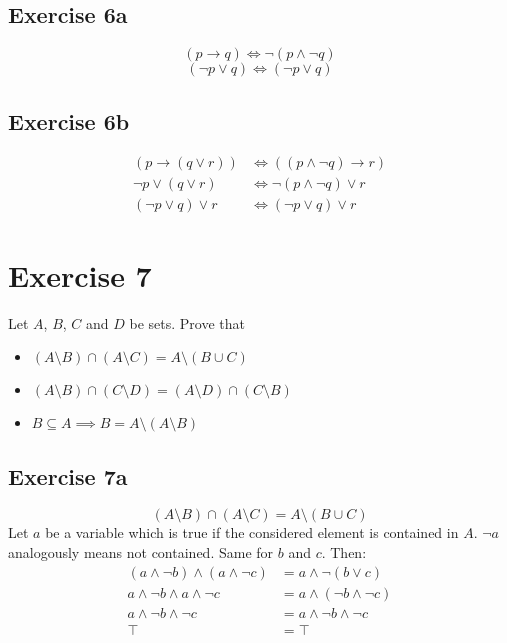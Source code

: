 \documentclass[a4paper]{article}
\theoremstyle{definition}
\begin{document}
\subsection{Exercise 6a}

\[ (p \rightarrow q) \iff \neg (p \land \neg q) \]
\[ (\neg p \lor q) \iff (\neg p \lor q) \]

\subsection{Exercise 6b}

\begin{align*}
  \left(p \rightarrow (q \lor r)\right) &\iff \left((p \land \neg q) \rightarrow r\right) \\
  \neg p \lor (q \lor r) &\iff \neg (p \land \neg q) \lor r \\
  (\neg p \lor q) \lor r &\iff (\neg p \lor q) \lor r
\end{align*}

\section{Exercise 7}
%
\begin{ex}
  Let $A$, $B$, $C$ and $D$ be sets. Prove that
  \begin{itemize}
    \item $(A \setminus B) \cap (A \setminus C) = A \setminus (B \cup C)$
    \item $(A \setminus B) \cap (C \setminus D) = (A \setminus D) \cap (C \setminus B)$
    \item $B \subseteq A \implies B = A \setminus (A \setminus B)$
  \end{itemize}
\end{ex}

\subsection{Exercise 7a}
\[ (A \setminus B) \cap (A \setminus C) = A \setminus (B \cup C) \]
%
Let $a$ be a variable which is true if the considered element is contained in $A$.
$\neg a$ analogously means not contained. Same for $b$ and $c$. Then:
\begin{align*}
  (a \land \neg b) \land (a \land \neg c) &= a \land \neg (b \lor c) \\
  a \land \neg b \land a \land \neg c &= a \land (\neg b \land \neg c) \\
  a \land \neg b \land \neg c &= a \land \neg b \land \neg c \\
  \top &= \top
\end{align*}
\end{document}
